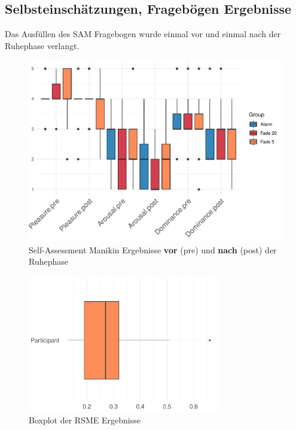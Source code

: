\subsection{Selbsteinschätzungen, Fragebögen Ergebnisse}

Das Ausfüllen des SAM Fragebogen wurde einmal vor und einmal nach der Ruhephase verlangt. 

\begin{figure}[H]
	\centering
	\includegraphics[width=\textwidth]{./_StudyResults/SAMresults}
	\caption{Self-Assessment Manikin Ergebnisse \textbf{vor} (pre) und \textbf{nach} (post) der Ruhephase}
	\label{fig:samResults}
\end{figure}


\begin{figure}[H]
	\centering
	\includegraphics[width=0.75\textwidth]{./_StudyResults/rsme}
	\caption{Boxplot der RSME Ergebnisse}
	\label{fig:rsme_vis}
\end{figure}

